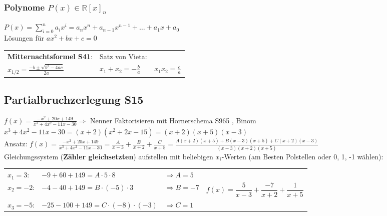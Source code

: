 \subsubsection{Polynome $P(x)\in\mathbb R[x]_n$}
$P(x)=\sum_{i=0}^n a_ix^i=a_n x^n+a_{n-1} x^{n-1}+\dotsc+a_1x+a_0$ \\
Lösungen für $ax^2+bx+c=0$ \\
\begin{tabular}{l|l}
\textbf{Mitternachtsformel \color{red} S41}:  &  Satz von Vieta:\\
$x_{1/2}=\frac{-b\pm\sqrt{b^2-4ac}}{2a}$  \quad & \quad   $x_1 + x_2 = - \frac{b}{a} \qquad x_1 x_2 = \frac{c}{a}$
\end{tabular}







\subsection{Partialbruchzerlegung \color{red} S15}
\label{sub:allgemeines}



$f(x)= \frac{-x^{2}+20x+149}{x^{3}+4x^{2}-11x-30} \Rightarrow$ Nenner Faktorisieren mit Hornerschema \color{red} S965 \color{black}, Binom\\ $x^{3}+4x^{2}-11x-30=(x+2)(x^{2}+2x-15)=(x+2)(x+5)(x-3)$ \\
Ansatz: $ f(x)= \frac{-x^{2}+20x+149}{x^{3}+4x^{2}-11x-30}=\frac{A}{x-3}+\frac{B}{x+2}+\frac{C}{x+5}=\frac{A(x+2)(x+5)+B(x-3)(x+5)+C(x+2)(x-3)}{(x-3)(x+2)(x+5)} $\\
Gleichungssystem (\textbf{Zähler gleichsetzten}) aufstellen mit beliebigen $x_{i}$-Werten (am Besten Polstellen oder 0, 1, -1 wählen):

\begin{tabulary}{12cm}{llll}
	
	$x_{1}=3$: 		& $-9+60+149=A\cdot 5\cdot 8$ 			& 	$\Rightarrow A=5$ 	&		\\
	$x_{2}=-2$:		&  $-4-40+149=B\cdot(-5)\cdot 3$ 		& 	$\Rightarrow B=-7$	&	$f(x)=\dfrac{5}{x-3}+\dfrac{-7}{x+2}+\dfrac{1}{x+5}$		\\ 
	$x_{3}=-5$: 	&  $-25-100+149=C\cdot (-8)\cdot (-3)$ 	& 	$\Rightarrow C=1$	&			\\

\end{tabulary}

